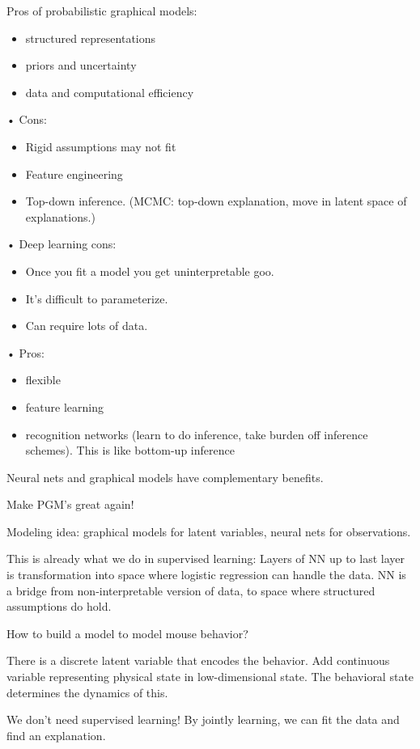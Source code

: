 Pros of probabilistic graphical models:
\begin{itemize}
\item
structured representations
\item
priors and uncertainty
\item
data and computational efficiency
\end{itemize}•
Cons:
\begin{itemize}
\item
Rigid assumptions may not fit
\item
Feature engineering
\item
Top-down inference. (MCMC: top-down explanation, move in latent space of explanations.)
\end{itemize}•
Deep learning cons:
\begin{itemize}
\item
Once you fit a model you get uninterpretable goo.
\item
It's difficult to parameterize.
\item
Can require lots of data.
\end{itemize}•
Pros:
\begin{itemize}
\item
flexible
\item
feature learning
\item recognition networks (learn to do inference, take burden off inference schemes). This is like bottom-up inference
\end{itemize}
Neural nets and graphical models have complementary benefits. 

Make PGM's great again!

Modeling idea: graphical models for latent variables, neural nets for observations.

This is already what we do in supervised learning: Layers of NN up to last layer is transformation into space where logistic regression can handle the data. NN is a bridge from non-interpretable version of data, to space where structured assumptions do hold.

How to build a model to model mouse behavior?

There is a discrete latent variable that encodes the behavior. Add continuous variable representing physical state in low-dimensional state. The behavioral state determines the dynamics of this.


We don't need supervised learning! By jointly learning, we can fit the data and find an explanation.

